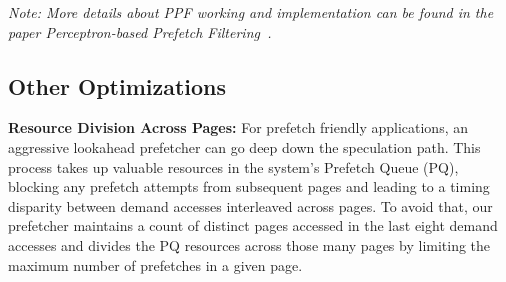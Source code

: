 \textit {Note: More details about PPF working and implementation can be found 
in the paper Perceptron-based Prefetch Filtering~\cite{EshanISCA2019}.}

\subsection{Other Optimizations}
\label{Enhancements-Misc}

\noindent \textbf{Resource Division Across Pages:}
For prefetch friendly applications, an aggressive lookahead prefetcher can go
deep down the speculation path. This process takes up valuable resources in the
system's Prefetch Queue (PQ), blocking any prefetch attempts from
subsequent pages and leading to a timing disparity between demand accesses
interleaved across pages. To avoid that, our prefetcher maintains a count of
distinct pages accessed in the last eight demand accesses and divides the PQ
resources across those many pages by limiting the maximum number of prefetches
in a given page.
